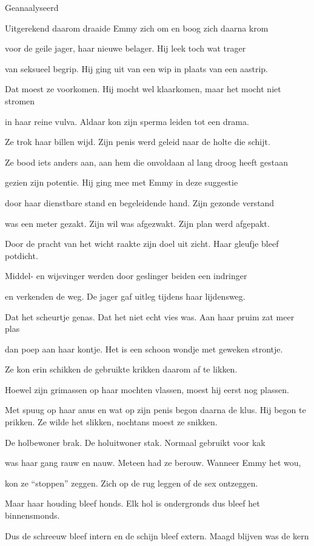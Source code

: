 Geanaalyseerd

Uitgerekend daarom
draaide Emmy zich om
en boog zich daarna krom

voor de geile jager,
haar nieuwe belager.
Hij leek toch wat trager

van seksueel begrip.
Hij ging uit van een wip
in plaats van een aastrip.

Dat moest ze voorkomen.
Hij mocht wel klaarkomen,
maar het mocht niet stromen

in haar reine vulva.
Aldaar kon zijn sperma
leiden tot een drama.

Ze trok haar billen wijd.
Zijn penis werd geleid
naar de holte die schijt.

Ze bood iets anders aan,
aan hem die onvoldaan
al lang droog heeft gestaan

gezien zijn potentie.
Hij ging mee met Emmy
in deze suggestie

door haar dienstbare stand
en begeleidende hand.
Zijn gezonde verstand

was een meter gezakt.
Zijn wil was afgezwakt.
Zijn plan werd afgepakt.

Door de pracht van het wicht
raakte zijn doel uit zicht.
Haar gleufje bleef potdicht.

Middel- en wijsvinger
werden door geslinger
beiden een indringer

en verkenden de weg.
De jager gaf uitleg
tijdens haar lijdensweg.

Dat het scheurtje genas.
Dat het niet echt vies was.
Aan haar pruim zat meer plas

dan poep aan haar kontje.
Het is een schoon wondje
met geweken strontje.

Ze kon erin schikken
de gebruikte krikken
daarom af te likken.

Hoewel zijn grimassen
op haar mochten vlassen,
moest hij eerst nog plassen.

Met spuug op haar anus
en wat op zijn penis
begon daarna de klus.
Hij begon te prikken.
Ze wilde het slikken,
nochtans moest ze snikken.

De holbewoner brak.
De holuitwoner stak.
Normaal gebruikt voor kak

was haar gang rauw en nauw.
Meteen had ze berouw.
Wanneer Emmy het wou,

kon ze “stoppen” zeggen.
Zich op de rug leggen
of de sex ontzeggen.

Maar haar houding bleef honds.
Elk hol is ondergronds
dus bleef het binnensmonds.

Dus de schreeuw bleef intern
en de schijn bleef extern.
Maagd blijven was de kern

